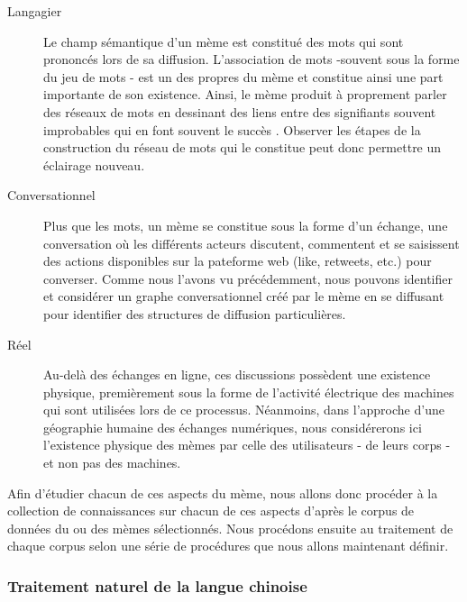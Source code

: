     \begin{description}
        \item[Langagier]
        Le champ sémantique d{\textquoteright}un mème est constitué des mots qui sont prononcés lors de sa diffusion. L{\textquoteright}association de mots -souvent sous la forme du jeu de mots - est un des propres du mème et constitue ainsi une part importante de son existence. Ainsi, le mème produit à proprement parler des réseaux de mots en dessinant des liens entre des signifiants souvent improbables qui en font souvent le succès \citep{Bauckhage2011}. Observer les étapes de la construction du réseau de mots qui le constitue peut donc permettre un éclairage nouveau.

        \item[Conversationnel] 
        Plus que les mots, un mème se constitue sous la forme d{\textquoteright}un échange, une conversation o\`u les différents acteurs discutent, commentent et se saisissent des actions disponibles sur la pateforme web (like, retweets, etc.) pour converser. Comme nous l{\textquoteright}avons vu précédemment, nous pouvons identifier et considérer un graphe conversationnel créé par le mème en se diffusant pour identifier des structures de diffusion particulières. 

        \item[Réel] 
        Au-delà des échanges en ligne, ces discussions possèdent une existence physique, premièrement sous la forme de l{\textquoteright}activité électrique des machines qui sont utilisées lors de ce processus. Néanmoins, dans l{\textquoteright}approche d{\textquoteright}une géographie humaine des échanges numériques, nous considérerons ici l{\textquoteright}existence physique des mèmes par celle des utilisateurs - de leurs corps - et non pas des machines. 
    \end{description}


    Afin d{\textquoteright}étudier chacun de ces aspects du mème, nous allons donc procéder à la collection de connaissances sur chacun de ces aspects d'après le corpus de données du ou des mèmes sélectionnés. Nous procédons ensuite au traitement de chaque corpus selon une série de procédures que nous allons maintenant définir. 

\subsubsection[Traitement naturel de la langue chinoise]{Traitement naturel de la langue chinoise}

